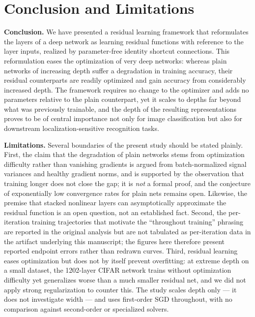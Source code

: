 \section{Conclusion and Limitations}
\label{sec:conclusion}

\noindent\textbf{Conclusion.}
We have presented a residual learning framework that reformulates the layers of
a deep network as learning residual functions with reference to the layer
inputs, realized by parameter-free identity shortcut connections. This
reformulation eases the optimization of very deep networks: whereas plain
networks of increasing depth suffer a degradation in training accuracy, their
residual counterparts are readily optimized and gain accuracy from considerably
increased depth. The framework requires no change to the optimizer and adds no
parameters relative to the plain counterpart, yet it scales to depths far beyond
what was previously trainable, and the depth of the resulting representations
proves to be of central importance not only for image classification but also
for downstream localization-sensitive recognition tasks.

\noindent\textbf{Limitations.}
Several boundaries of the present study should be stated plainly. First, the
claim that the degradation of plain networks stems from optimization difficulty
rather than vanishing gradients is argued from batch-normalized signal variances
and healthy gradient norms, and is supported by the observation that training
longer does not close the gap; it is \emph{not} a formal proof, and the
conjecture of exponentially low convergence rates for plain nets remains open.
Likewise, the premise that stacked nonlinear layers can asymptotically
approximate the residual function is an open question, not an established fact.
Second, the per-iteration training trajectories that motivate the ``throughout
training'' phrasing are reported in the original analysis but are not tabulated
as per-iteration data in the artifact underlying this manuscript; the figures
here therefore present reported endpoint errors rather than redrawn curves.
Third, residual learning eases optimization but does not by itself prevent
overfitting: at extreme depth on a small dataset, the 1202-layer CIFAR network
trains without optimization difficulty yet generalizes worse than a much smaller
residual net, and we did not apply strong regularization to counter this. The
study scales depth only --- it does not investigate width --- and uses
first-order SGD throughout, with no comparison against second-order or
specialized solvers.


